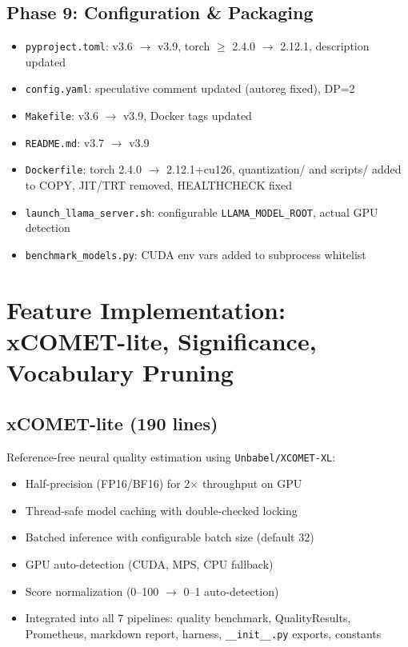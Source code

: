 \documentclass[11pt,a4paper,twoside]{article}
\begin{document}
\subsection{Phase 9: Configuration \& Packaging}

\begin{itemize}[nosep]
  \item \texttt{pyproject.toml}: v3.6 $\rightarrow$ v3.9, torch $\geq$ 2.4.0
    $\rightarrow$ 2.12.1, description updated
  \item \texttt{config.yaml}: speculative comment updated (autoreg fixed), DP=2
  \item \texttt{Makefile}: v3.6 $\rightarrow$ v3.9, Docker tags updated
  \item \texttt{README.md}: v3.7 $\rightarrow$ v3.9
  \item \texttt{Dockerfile}: torch 2.4.0 $\rightarrow$ 2.12.1+cu126, quantization/
    and scripts/ added to COPY, JIT/TRT removed, HEALTHCHECK fixed
  \item \texttt{launch\_llama\_server.sh}: configurable \texttt{LLAMA\_MODEL\_ROOT},
    actual GPU detection
  \item \texttt{benchmark\_models.py}: CUDA env vars added to subprocess whitelist
\end{itemize}

\section{Feature Implementation: xCOMET-lite, Significance, Vocabulary Pruning}

\subsection{xCOMET-lite (190 lines)}

Reference-free neural quality estimation using \texttt{Unbabel/XCOMET-XL}:

\begin{itemize}[nosep]
  \item Half-precision (FP16/BF16) for 2$\times$ throughput on GPU
  \item Thread-safe model caching with double-checked locking
  \item Batched inference with configurable batch size (default 32)
  \item GPU auto-detection (CUDA, MPS, CPU fallback)
  \item Score normalization (0--100 $\rightarrow$ 0--1 auto-detection)
  \item Integrated into all 7 pipelines: quality benchmark, QualityResults,
    Prometheus, markdown report, harness, \texttt{\_\_init\_\_.py} exports,
    constants
\end{itemize}
\end{document}
